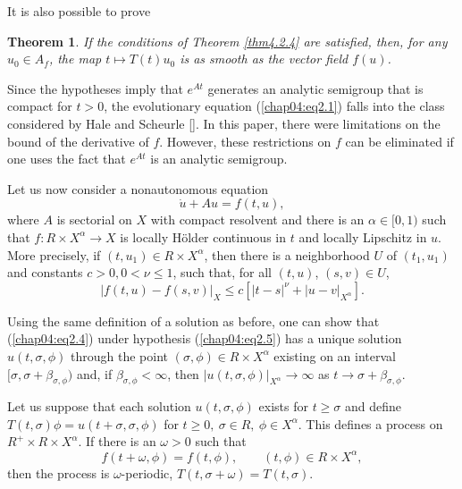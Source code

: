 \documentclass{surv-l}
\theoremstyle{plain}
\newtheorem{theorem}{Theorem}[section]
\theoremstyle{definition}
\numberwithin{equation}{section}
\numberwithin{figure}{chapter}
\begin{document}
It is also possible to prove

\begin{theorem}\label{thm4.2.5}
If the conditions of Theorem \ref{thm4.2.4} are satisfied, then, for
any $u_{0}\in A_{f}$, the map $t\longmapsto T(t)u_{0}$ is as smooth as the vector field $f(u)$.
\end{theorem}


Since the hypotheses imply that $e^{At}$ generates an analytic semigroup that is compact for $t>0$, the evolutionary equation (\ref{chap04:eq2.1}) falls into the class considered by Hale and Scheurle [\citeyear{1985hs}]. In this paper, there were limitations on the bound of the derivative of $f$. However, these restrictions on $f$ can be eliminated if one uses the fact that $e^{At}$ is an analytic semigroup.

Let us now consider a nonautonomous equation
\begin{equation}\label{chap04:eq2.4}
\dot{u}+Au=f(t, u),
\end{equation}
where $A$ is sectorial on $X$ with compact resolvent and there is an $\alpha\in[0,1)$ such that $f\!:R\times X^{\alpha}\rightarrow X$ is locally H\"{o}lder continuous in $t$ and locally Lipschitz in $u$. More precisely, if $(t, u_{1})\in R\times X^{\alpha}$, then there is a neighborhood $U$ of $(t_{1}, u_{1})$ and constants $c>0,0<\nu \leq 1$, such that, for all $(t, u)$, $(s, v)\in U$,
\begin{equation}\label{chap04:eq2.5}
|f(t, u)-f(s, v)|_{X}\leq c[|t-s|^{\nu}+|u-v|_{X^{\alpha}}].
\end{equation}

Using the same definition of a solution as before, one can show that (\ref{chap04:eq2.4}) under hypothesis (\ref{chap04:eq2.5}) has a unique solution $u(t, \sigma, \phi)$ through the point $(\sigma, \phi)\in R\times X^{\alpha}$ existing on an interval $[\sigma, \sigma+\beta_{\sigma,\phi})$ and, if $\beta_{\sigma,\phi}<\infty$, then $|u(t, \sigma, \phi)|_{X^{\alpha}}\rightarrow\infty$ as $t\rightarrow\sigma+\beta_{\sigma,\phi}$.

Let us suppose that each solution $u(t, \sigma, \phi)$ exists for $ t\geq\sigma$ and define $ T(t, \sigma)\phi =u(t+\sigma, \sigma, \phi)$ for $t\geq 0,\ \sigma\in R,\ \phi\in X^{\alpha}$. This defines a process on $R^{+}\times R\times X^{\alpha}$. If there is an $\omega >0$ such that
\begin{equation}\label{chap04:eq2.6}
f(t+\omega, \phi)=f(t, \phi),\qquad(t, \phi)\in R\times X^{\alpha},
\end{equation}
then the process is $\omega$-periodic, $T(t, \sigma+\omega)=T(t, \sigma)$.
\end{document}
